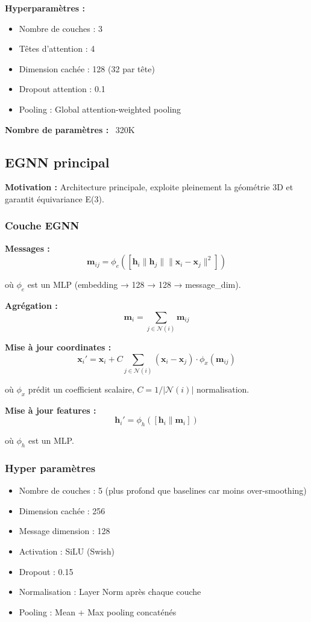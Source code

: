 \textbf{Hyperparamètres :}
\begin{itemize}
    \item Nombre de couches : 3
    \item Têtes d'attention : 4
    \item Dimension cachée : 128 (32 par tête)
    \item Dropout attention : 0.1
    \item Pooling : Global attention-weighted pooling
\end{itemize}

\textbf{Nombre de paramètres :} ~320K

\subsection{EGNN principal}

\textbf{Motivation :}
Architecture principale, exploite pleinement la géométrie 3D et garantit équivariance E(3).

\subsubsection{Couche EGNN}

\textbf{Messages :}
\[
\mathbf{m}_{ij} = \phi_e\left([\mathbf{h}_i \| \mathbf{h}_j \| \|\mathbf{x}_i - \mathbf{x}_j\|^2]\right)
\]

où $\phi_e$ est un MLP (embedding → 128 → 128 → message\_dim).

\textbf{Agrégation :}
\[
\mathbf{m}_i = \sum_{j \in \mathcal{N}(i)} \mathbf{m}_{ij}
\]

\textbf{Mise à jour coordinates :}
\[
\mathbf{x}_i' = \mathbf{x}_i + C \sum_{j \in \mathcal{N}(i)} (\mathbf{x}_i - \mathbf{x}_j) \cdot \phi_x(\mathbf{m}_{ij})
\]

où $\phi_x$ prédit un coefficient scalaire, $C = 1/|\mathcal{N}(i)|$ normalisation.

\textbf{Mise à jour features :}
\[
\mathbf{h}_i' = \phi_h([\mathbf{h}_i \| \mathbf{m}_i])
\]

où $\phi_h$ est un MLP.

\subsubsection{Hyper paramètres}

\begin{itemize}
    \item Nombre de couches : 5 (plus profond que baselines car moins over-smoothing)
    \item Dimension cachée : 256
    \item Message dimension : 128
    \item Activation : SiLU (Swish)
    \item Dropout : 0.15
    \item Normalisation : Layer Norm après chaque couche
    \item Pooling : Mean + Max pooling concaténés
\end{itemize}


